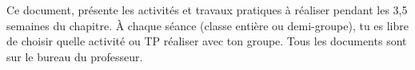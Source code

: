 \teteSndAtom
\reinitialiseActiviteTP
\vspace*{-40pt}
\vspace*{-8pt}

  Ce document,  présente les activités et travaux pratiques à réaliser pendant les 3,5 semaines du chapitre.
  À chaque séance (classe entière ou demi-groupe), tu es libre de choisir quelle activité ou TP réaliser avec ton groupe.
  Tous les documents sont sur le bureau du professeur.


\vspace*{-18pt}

